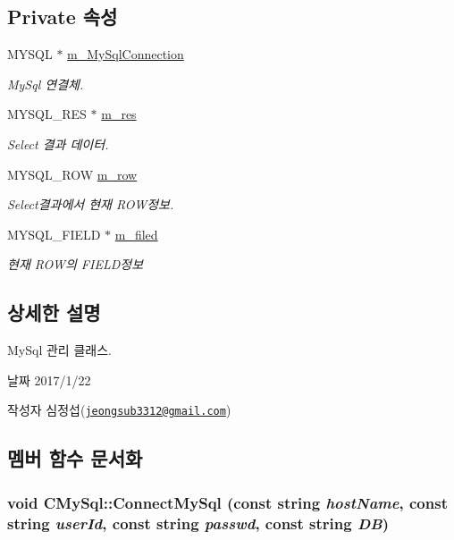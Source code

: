 \subsection*{Private 속성}
\begin{DoxyCompactItemize}
\item 
MYSQL $\ast$ \hyperlink{classCMySql_a74732c9ad7550228311df70ff7846870}{m\_\-MySqlConnection}
\begin{DoxyCompactList}\small\item\em MySql 연결체. \item\end{DoxyCompactList}\item 
MYSQL\_\-RES $\ast$ \hyperlink{classCMySql_a434ad1058383726a4e0851bd4af83bed}{m\_\-res}
\begin{DoxyCompactList}\small\item\em Select 결과 데이터. \item\end{DoxyCompactList}\item 
MYSQL\_\-ROW \hyperlink{classCMySql_a9f0d22a3ca8f698ed70289452342f53e}{m\_\-row}
\begin{DoxyCompactList}\small\item\em Select결과에서 현재 ROW정보. \item\end{DoxyCompactList}\item 
MYSQL\_\-FIELD $\ast$ \hyperlink{classCMySql_a3733f6741b063ef20005dfe92893655b}{m\_\-filed}
\begin{DoxyCompactList}\small\item\em 현재 ROW의 FIELD정보 \item\end{DoxyCompactList}\end{DoxyCompactItemize}


\subsection{상세한 설명}
MySql 관리 클래스. \begin{DoxyDate}{날짜}
2017/1/22 
\end{DoxyDate}
\begin{DoxyAuthor}{작성자}
심정섭(\href{mailto:jeongsub3312@gmail.com}{\tt jeongsub3312@gmail.com}) 
\end{DoxyAuthor}


\subsection{멤버 함수 문서화}
\hypertarget{classCMySql_a0b2f602fc0a7b291d4a0cec59fa76124}{
\subsubsection[{ConnectMySql}]{\setlength{\rightskip}{0pt plus 5cm}void CMySql::ConnectMySql (const string {\em hostName}, \/  const string {\em userId}, \/  const string {\em passwd}, \/  const string {\em DB})}}
\label{classCMySql_a0b2f602fc0a7b291d4a0cec59fa76124}



